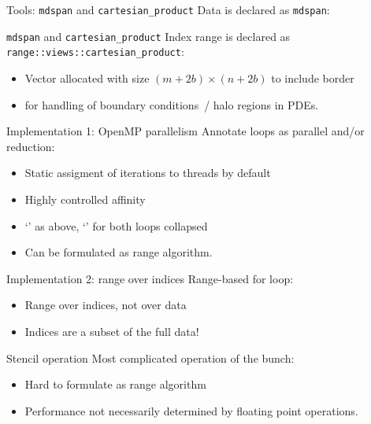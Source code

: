 \documentclass[10pt,t]{beamer}
\begin{document}
\begin{frame}[containsverbatim]{Tools: \texttt{mdspan} and \texttt{cartesian\_product}}
  Data is declared as \lstinline{mdspan}:
  \hbox\bgroup
  \egroup
\end{frame}

\begin{frame}[containsverbatim]{\texttt{mdspan} and \texttt{cartesian\_product}}
  Index range is declared as \lstinline{range::views::cartesian_product}:
  \begin{itemize}
  \item Vector allocated with size $(m+2b)\times(n+2b)$ to include border
  \item for handling of boundary conditions~/ halo regions in PDEs.
  \end{itemize}
\end{frame}

\begin{frame}[containsverbatim]{Implementation 1: OpenMP parallelism}
  Annotate loops as parallel and/or reduction:
  \begin{itemize}
  \item Static assigment of iterations to threads by default
  \item Highly controlled affinity
  \item `' as above, `' for both loops collapsed
  \item Can be formulated as range algorithm.
  \end{itemize}
\end{frame}

\begin{frame}[containsverbatim]{Implementation 2: range over indices}
  Range-based for loop:
  \begin{itemize}
  \item Range over indices, not over data
  \item Indices are a subset of the full data!
  \end{itemize}
\end{frame}

\begin{frame}[containsverbatim]{Stencil operation}
  Most complicated operation of the bunch:
  \begin{itemize}
  \item Hard to formulate as range algorithm
  \item Performance not necessarily determined by floating point operations.
  \end{itemize}
\end{frame}
\end{document}
